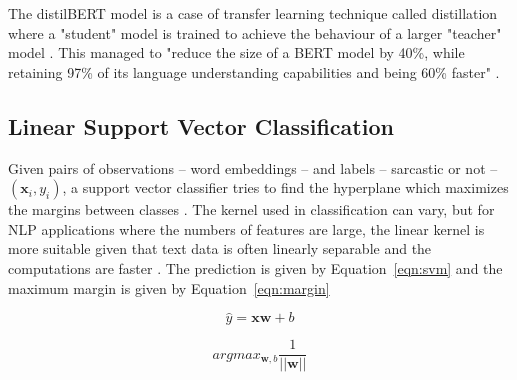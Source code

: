 The distilBERT model is a case of transfer learning technique called distillation where a "student" model is trained to achieve  the behaviour of a larger "teacher" model \citep{sanh2020distilbert}. This managed to "reduce the size of a BERT model by 40\%, while retaining 97\% of its language understanding capabilities and being 60\% faster" \citep{sanh2020distilbert}.



\subsection{Linear Support Vector Classification}

Given pairs of observations -- word embeddings -- and labels -- sarcastic or not -- $(\mathbf{x}_i, y_i)$, a support vector classifier tries to find the hyperplane which maximizes the margins between classes \citep{pena2019}. The kernel used in classification can vary, but for NLP applications where the numbers of features are large, the linear kernel is more suitable given that text data is often linearly separable and the computations are faster \citep{hsu2003}. The prediction is given by Equation~\ref{eqn:svm} and  the maximum margin is given by Equation~\ref{eqn:margin} \citep{pena2019} 

\begin{equation}
	\label{eqn:svm}
 	\hat{y}= \mathbf{xw} +  b
\end{equation}

\begin{equation}
	\label{eqn:margin}
	argmax_{\mathbf{w}, b} \frac{1}{||\mathbf{w}||}
\end{equation}


